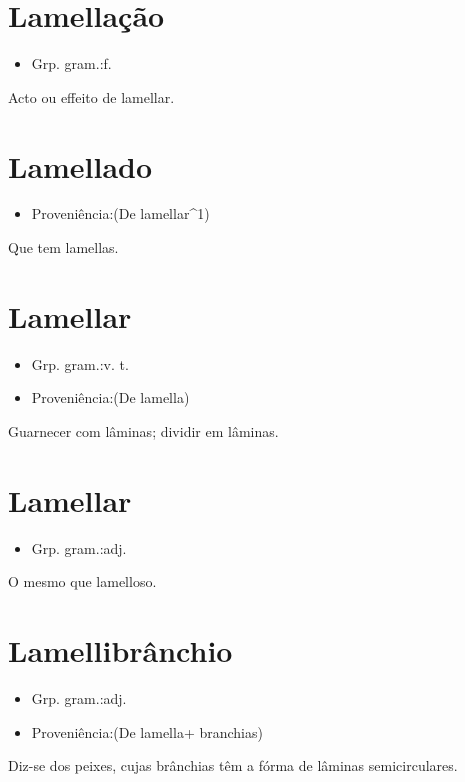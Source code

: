 \section{Lamellação}
\begin{itemize}
\item {Grp. gram.:f.}
\end{itemize}
Acto ou effeito de lamellar.
\section{Lamellado}
\begin{itemize}
\item {Proveniência:(De \textunderscore lamellar\textunderscore ^1)}
\end{itemize}
Que tem lamellas.
\section{Lamellar}
\begin{itemize}
\item {Grp. gram.:v. t.}
\end{itemize}
\begin{itemize}
\item {Proveniência:(De \textunderscore lamella\textunderscore )}
\end{itemize}
Guarnecer com lâminas; dividir em lâminas.
\section{Lamellar}
\begin{itemize}
\item {Grp. gram.:adj.}
\end{itemize}
O mesmo que \textunderscore lamelloso\textunderscore .
\section{Lamellibrânchio}
\begin{itemize}
\item {Grp. gram.:adj.}
\end{itemize}
\begin{itemize}
\item {Proveniência:(De \textunderscore lamella\textunderscore  + \textunderscore branchias\textunderscore )}
\end{itemize}
Diz-se dos peixes, cujas brânchias têm a fórma de lâminas semicirculares.

